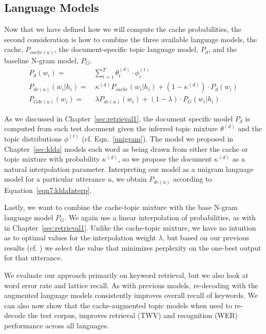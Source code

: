\subsection{Language Models}
Now that we have defined how we will compute the cache probabilities, the second consideration is how to combine the three available language models, the cache, $P_{cache(u)}$, the document-specific topic language model, $P_d$, and the baseline N-gram model, $P_{G}$.
\begin{align}
P_d(w_i) =& \sum_{t=1}^T \theta^{(d)}_t \cdot \phi^{(t)}_i \label{unigram} \\   
P_{dc(u)}(w_i|h_i) =& \,\kappa^{(d)} P_{cache}(w_i|h_i) + (1-\kappa^{(d)}) \cdot  P_{d}(w_i) \label{eqn7:kldaInterp} \\
P_{Gdc(u)}(w_i) =& \,\lambda P_{dc(u)}(w_i) + (1-\lambda)\cdot P_{G}(w_i|h_i) \label{perDoc} 
\end{align}

As we discussed in Chapter~\ref{sec:retrieval1}, the document specific model $P_d$ is computed from each test document given the inferred topic mixture $\theta^{(d)}$ and the topic distributions $\phi^{(t)}$ (cf. Eqn.~\ref{unigram}).  The model we proposed in Chapter~\ref{sec:klda} models each word as being drawn from either the cache or topic mixture with probability $\kappa^{(d)}$, so we propose the document $\kappa^{(d)}$ as a natural interpolation parameter.  Interpreting our model as a unigram language model for a particular utterance $u$, we obtain $P_{dc(u)}$ according to Equation~\ref{eqn7:kldaInterp}.


Lastly, we want to combine the cache-topic mixture with the base N-gram language model $P_{G}$.  We again use a linear interpolation of probabilities, as with in Chapter~\ref{sec:retrieval1}.  Unlike the cache-topic mixture, we have no intuition as to optimal values for the interpolation weight $\lambda$, but based on our previous results (cf. \cite{wintrode2014slta}) we select the value that minimizes perplexity on the one-best output for that utterance.  

We evaluate our approach primarily on keyword retrieval, but we also look at word error rate and lattice recall.  As with previous models, re-decoding with the augmented language models consistently improves overall recall of keywords.  We can also now show that the cache-augmented topic models when used to re-decode the test corpus, improves retrieval (TWV) and recognition (WER) performance across all languages.


